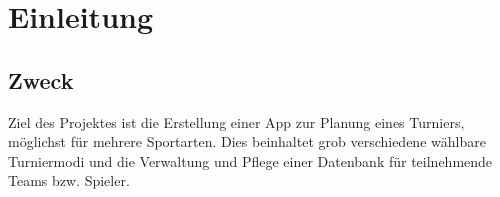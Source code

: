 \chapter{Einleitung}
\section{Zweck}
Ziel des Projektes ist die Erstellung einer App zur Planung eines Turniers, möglichst für mehrere Sportarten. Dies beinhaltet grob verschiedene wählbare Turniermodi und die Verwaltung und Pflege einer Datenbank für teilnehmende Teams bzw. Spieler. 